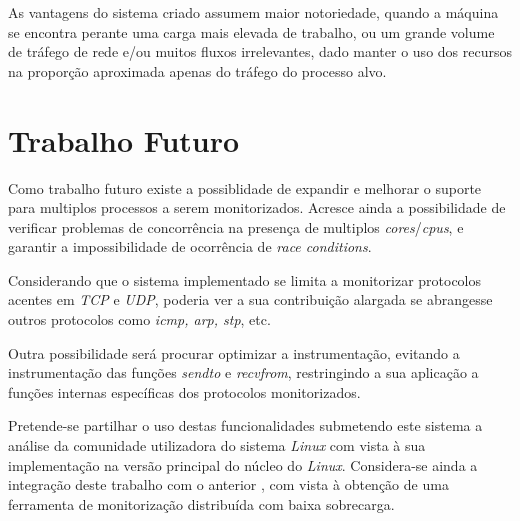 As vantagens do sistema criado assumem maior notoriedade, quando a máquina se encontra perante uma carga mais elevada de trabalho, ou um grande volume de tráfego de rede e/ou muitos fluxos irrelevantes, dado manter o uso dos recursos na proporção aproximada apenas do tráfego do processo alvo.

\section{Trabalho Futuro}
\label{sec:future_work}
Como trabalho futuro existe a possiblidade de expandir e melhorar o suporte para multiplos processos a serem monitorizados.
Acresce ainda a possibilidade de verificar problemas de concorrência na presença de multiplos \textit{cores}/\textit{cpus}, e garantir a impossibilidade de ocorrência de \textit{race conditions}.

Considerando que o sistema implementado se limita a monitorizar protocolos acentes em \textit{TCP} e \textit{UDP}, poderia ver a sua contribuição alargada se abrangesse outros protocolos como \textit{icmp, arp, stp}, etc.

Outra possibilidade será procurar optimizar a instrumentação, evitando a instrumentação das funções \textit{sendto} e \textit{recvfrom}, restringindo a sua aplicação a funções internas específicas dos protocolos monitorizados.

Pretende-se partilhar o uso destas funcionalidades submetendo este sistema a análise da comunidade utilizadora do sistema \textit{Linux} com vista à sua implementação na versão principal do núcleo do \textit{Linux}.
Considera-se ainda a integração deste trabalho com o anterior \cite{duarte10,Farruca:2009}, com vista à obtenção de uma ferramenta de monitorização distribuída com baixa sobrecarga.
